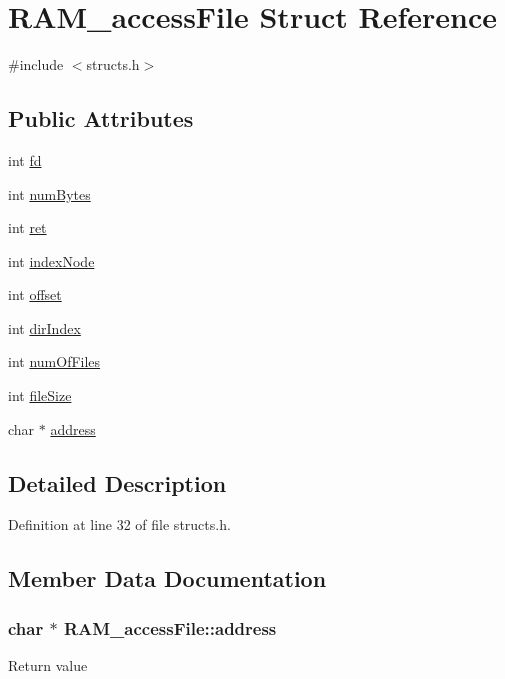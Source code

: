 \hypertarget{struct_r_a_m__access_file}{\section{R\-A\-M\-\_\-access\-File Struct Reference}
\label{struct_r_a_m__access_file}
}


{\ttfamily \#include $<$structs.\-h$>$}

\subsection*{Public Attributes}
\begin{DoxyCompactItemize}
\item 
int \hyperlink{struct_r_a_m__access_file_a2eb9b6645a513c67c97117a00f31f039}{fd}
\item 
int \hyperlink{struct_r_a_m__access_file_adcdf87bed2c5050b88e5504845f7e8d5}{num\-Bytes}
\item 
int \hyperlink{struct_r_a_m__access_file_a8a6a93cf254de895c2da7d176aa57c5d}{ret}
\item 
int \hyperlink{struct_r_a_m__access_file_af142abebca241fdf69a9835cdd769ec6}{index\-Node}
\item 
int \hyperlink{struct_r_a_m__access_file_aabb72f7eb0128f37b67198c536d7cd77}{offset}
\item 
int \hyperlink{struct_r_a_m__access_file_aed38abd6dad05bf93626ba21ef15fd24}{dir\-Index}
\item 
int \hyperlink{struct_r_a_m__access_file_af11f473315810e213ebba52da9279195}{num\-Of\-Files}
\item 
int \hyperlink{struct_r_a_m__access_file_a60a3744c8b18b285bb3ca28fdc287043}{file\-Size}
\item 
char $\ast$ \hyperlink{struct_r_a_m__access_file_aab0e69763b3195082abf02f9c79a5ee8}{address}
\end{DoxyCompactItemize}


\subsection{Detailed Description}


Definition at line 32 of file structs.\-h.



\subsection{Member Data Documentation}
\hypertarget{struct_r_a_m__access_file_aab0e69763b3195082abf02f9c79a5ee8}{
\subsubsection[{address}]{\setlength{\rightskip}{0pt plus 5cm}char $\ast$ R\-A\-M\-\_\-access\-File\-::address}}\label{struct_r_a_m__access_file_aab0e69763b3195082abf02f9c79a5ee8}
Return value 

